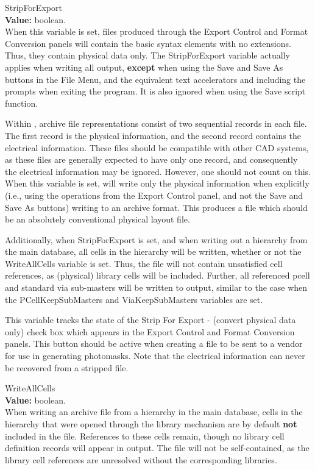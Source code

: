 \begin{description}
\item{\et StripForExport}\\
{\bf Value:} boolean.\\
When this variable is set, files produced through the {\cb Export
Control} and {\cb Format Conversion} panels will contain the basic
syntax elements with no extensions.  Thus, they contain physical data
only.  The {\et StripForExport} variable actually applies when writing
all output, {\bf except} when using the {\cb Save} and {\cb Save As}
buttons in the {\cb File Menu}, and the equivalent text accelerators
and including the prompts when exiting the program.  It is also
ignored when using the {\vt Save} script function.

Within {\Xic}, archive file representations consist of two sequential
records in each file.  The first record is the physical information,
and the second record contains the electrical information.  These
files should be compatible with other CAD systems, as these files are
generally expected to have only one record, and consequently the
electrical information may be ignored.  However, one should not count
on this.  When this variable is set, {\Xic} will write only the
physical information when explicitly (i.e., using the operations from
the {\cb Export Control} panel, and not the {\cb Save} and {\cb Save
As} buttons) writing to an archive format.  This produces a file which
should be an absolutely conventional physical layout file.

Additionally, when {\et StripForExport} is set, and when writing out a
hierarchy from the main database, all cells in the hierarchy will be
written, whether or not the {\et WriteAllCells} variable is set. 
Thus, the file will not contain unsatisfied cell references, as
(physical) library cells will be included.  Further, all referenced
pcell and standard via sub-masters will be written to output, similar
to the case when the {\et PCellKeepSubMasters} and {\et
ViaKeepSubMasters} variables are set. 

This variable tracks the state of the {\cb Strip For Export - (convert
physical data only)} check box which appears in the {\cb Export
Control} and {\cb Format Conversion} panels.  This button should be
active when creating a file to be sent to a vendor for use in
generating photomasks.  Note that the electrical information can never
be recovered from a stripped file.

\item{\et WriteAllCells}\\
{\bf Value:} boolean.\\
When writing an archive file from a hierarchy in the main database,
cells in the hierarchy that were opened through the library mechanism
are by default {\bf not} included in the file.  References to these
cells remain, though no library cell definition records will appear in
output.  The file will not be self-contained, as the library cell
references are unresolved without the corresponding libraries.


\end{description}
